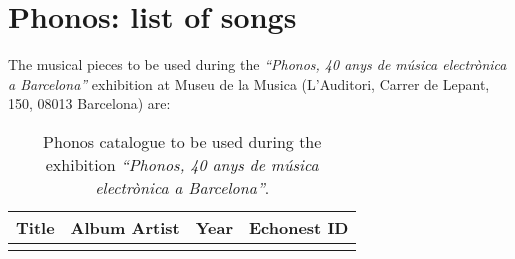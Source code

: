 \chapter{Phonos: list of songs} 

\label{AppendixC} 


The musical pieces to be used during the \textit{``Phonos, 40 anys de música electrònica a Barcelona''} exhibition at Museu de la Musica (L'Auditori, Carrer de Lepant, 150, 08013 Barcelona) are: 

\begin{center}
\begin{longtable}{| p{} | p{} | p{} | p{} |} 
\hline
\textbf{Title} & \textbf{Album Artist} & \textbf{Year} & \textbf{Echonest ID} \\ \hline

\caption[Phonos catalogue of songs]{Phonos catalogue to be used during the exhibition \textit{``Phonos, 40 anys de música electrònica a Barcelona''}.}
\label{table:phonosCatalogue}
\end{longtable}
\end{center}